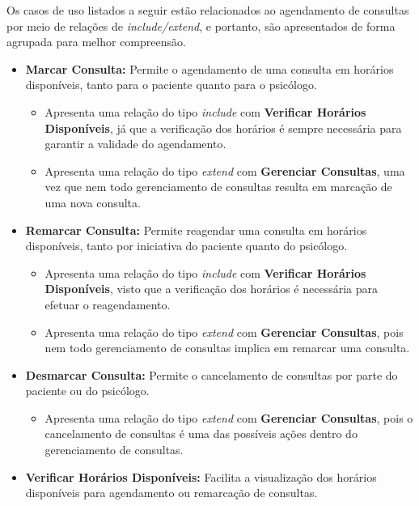 \documentclass[a4paper,12pt]{report}
\begin{document}
Os casos de uso listados a seguir estão relacionados ao agendamento de consultas por meio de relações de \textit{include/extend}, e portanto, são apresentados de forma agrupada para melhor compreensão. 

\begin{itemize}
    \item \textbf{Marcar Consulta:} Permite o agendamento de uma consulta em horários disponíveis, tanto para o paciente quanto para o psicólogo. 
    \begin{itemize}
        \item Apresenta uma relação do tipo \textit{include} com \textbf{Verificar Horários Disponíveis}, já que a verificação dos horários é sempre necessária para garantir a validade do agendamento.
        \item Apresenta uma relação do tipo \textit{extend} com \textbf{Gerenciar Consultas}, uma vez que nem todo gerenciamento de consultas resulta em marcação de uma nova consulta.
    \end{itemize}

    \item \textbf{Remarcar Consulta:} Permite reagendar uma consulta em horários disponíveis, tanto por iniciativa do paciente quanto do psicólogo.
    \begin{itemize}
        \item Apresenta uma relação do tipo \textit{include} com \textbf{Verificar Horários Disponíveis}, visto que a verificação dos horários é necessária para efetuar o reagendamento.
        \item Apresenta uma relação do tipo \textit{extend} com \textbf{Gerenciar Consultas}, pois nem todo gerenciamento de consultas implica em remarcar uma consulta.
    \end{itemize}

    \item \textbf{Desmarcar Consulta:} Permite o cancelamento de consultas por parte do paciente ou do psicólogo.
    \begin{itemize}
        \item Apresenta uma relação do tipo \textit{extend} com \textbf{Gerenciar Consultas}, pois o cancelamento de consultas é uma das possíveis ações dentro do gerenciamento de consultas.
    \end{itemize}
    
    \item \textbf{Verificar Horários Disponíveis:} Facilita a visualização dos horários disponíveis para agendamento ou remarcação de consultas.
\end{itemize}
\end{document}
